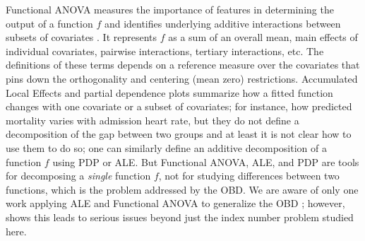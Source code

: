 Functional ANOVA measures the importance of features in determining the output of a function $f$ and identifies underlying additive interactions between subsets of covariates \citep{hooker2004discovering, hookerGeneralizedFunctionalANOVA2007}.
It represents $f$ as a sum of an overall mean, main effects of individual covariates, pairwise interactions, tertiary interactions, etc. The definitions of these terms depends on a reference measure over the covariates that pins down the orthogonality and centering (mean zero) restrictions.
Accumulated Local Effects \citep[ALE;][]{apley2020} and partial dependence plots \citep[PDP;][]{friedman2001greedy} summarize how a fitted function changes with one covariate or a subset of covariates; for instance, how predicted mortality varies with admission heart rate, but they do not define a decomposition of the gap between two groups and at least it is not clear how to use them to do so; one can similarly define an additive decomposition of a function $f$ using PDP or ALE.
But Functional ANOVA, ALE, and PDP are tools for decomposing a \emph{single} function $f$, not for studying differences between two functions, which is the problem addressed by the OBD.
We are aware of only one work applying ALE and Functional ANOVA to generalize the OBD \citep{quintero2025}; however, \citet{quintero2025} shows this leads to serious issues beyond just the index number problem studied here.



